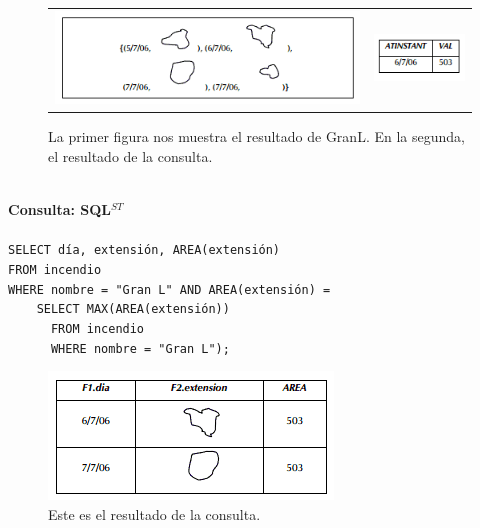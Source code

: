 \documentclass[a4paper,12pt,oneside]{report}
\begin{document}
\begin{figure}[h]
\centering
\begin{tabular}{c c}
\includegraphics[scale=0.6]{images/consultaGranL1.png}
&
\includegraphics[scale=0.6]{images/consultaGranL2.png}
\end{tabular}
\caption{La primer figura nos muestra el resultado de GranL. En la segunda, el resultado de la consulta.}
\end{figure}

\ \\
\textbf{Consulta: SQL$^{ST}$}\\
\ \\
\texttt{SELECT d\'ia, extensi\'on, AREA(extensi\'on)\\
FROM incendio\\
WHERE nombre = "Gran L" AND AREA(extensi\'on) =\\
\ \ \ \ SELECT MAX(AREA(extensi\'on))\\
\ \ \ \ \ \ FROM incendio\\
\ \ \ \ \ \ WHERE nombre = "Gran L");\\}

\begin{figure}[h]
\centering

\includegraphics[scale=0.6]{images/resultadosqlst1.png}
\caption{Este es el resultado de la consulta.}
\end{figure}
\end{document}
